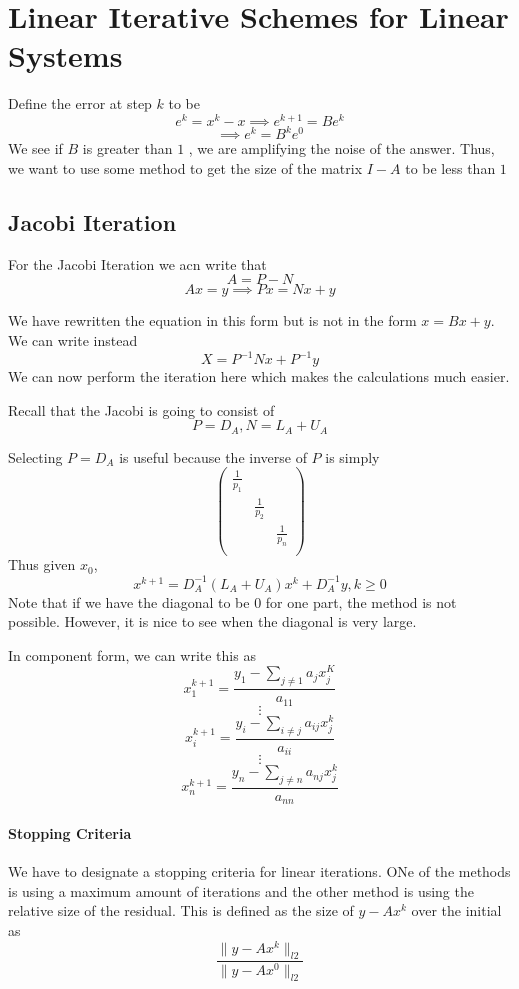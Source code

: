 \section{Linear Iterative Schemes for Linear Systems}
\begin{definition}
    Define the error at step \(k\)  to be 
    \[
        e^k = x^k -x \implies e^{k+1} = Be^k
    \]
    \[
        \implies e^k = B^k e^0
    \]
    We see if \(B\) is greater than \(1\) , we are amplifying the noise of the answer. Thus, we want to use some method 
    to get the size of the matrix \(I-A\) to be less than \(1\) 
\end{definition}

\subsection{Jacobi Iteration}
For the Jacobi Iteration we acn write that 
\[
    A= P-N
\]
\[
    Ax=y \implies Px = Nx +y 
\]
\begin{remark}
    We have rewritten the equation in this form but is not in the form \(x= Bx +y\). We can write instead 
    \[
        X = P^{-1} N x + P^{-1} y
    \]
    We can now perform the iteration here which makes the calculations much easier. 
\end{remark}
Recall that the Jacobi is going to consist of 
\[
    P= D_A, N = L_A + U_A
\]
\begin{remark}
    Selecting \(P = D_A\) is useful because the inverse of \(P \) is simply 
    \[
        \begin{pmatrix}
            \frac{1}{p_1} &  &   \\
             &  \frac{1}{p_2}&   \\
             &  &   \frac{1}{p_n}\\
        \end{pmatrix}
    \]
    Thus given \(x_0\),
    \[
        x^{k+1} = D^{-1}_A (L_A + U_A) x^k + D^{-1}_A y, k \geq 0   
    \]
    Note that if we have the diagonal to be 0 for one part, the method is not possible. However, it is nice 
    to see when the diagonal is very large. 
\end{remark}
In component form, we can write this as 
\[
    x_1^{k+1} = \frac{y_1 - \sum_{j \neq  1 }a_j x_j^K }{a_{11} }
\]
\[
    \vdots  
\]
\[
    x_i^{k+1} = \frac{y_i - \sum_{i \neq j} a_{ij} x_j^k }{a_{ii} } 
\]
\[
    \vdots
\]
\[
    x_n^{k+1} = \frac{y_n - \sum_{j \neq  n} a_{nj} x_j^k }{a_{nn} }
\]
\paragraph{Stopping Criteria}
We have to designate a stopping criteria for linear iterations. ONe of the methods is using a maximum amount of iterations 
and the other method is using the relative size of the residual. This is defined as the size of \(y - A x^k\) over the initial as 
\[
    \frac{\lVert y- Ax^k \rVert _{l2} }{\lVert y-Ax^0 \rVert _{l2}}
\] 